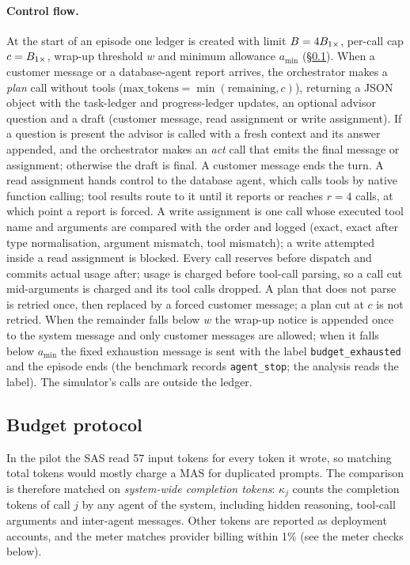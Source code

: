 \paragraph{Control flow.} At the start of an episode one ledger is created with limit $B = 4B_{1\times}$, per-call cap $c = B_{1\times}$, wrap-up threshold $w$ and minimum allowance $a_{\min}$ (\S\ref{sec:budget}). When a customer message or a database-agent report arrives, the orchestrator makes a \emph{plan} call without tools ($\text{max\_tokens} = \min(\text{remaining}, c)$), returning a JSON object with the task-ledger and progress-ledger updates, an optional advisor question and a draft (customer message, read assignment or write assignment). If a question is present the advisor is called with a fresh context and its answer appended, and the orchestrator makes an \emph{act} call that emits the final message or assignment; otherwise the draft is final. A customer message ends the turn. A read assignment hands control to the database agent, which calls tools by native function calling; tool results route to it until it reports or reaches $r = 4$ calls, at which point a report is forced. A write assignment is one call whose executed tool name and arguments are compared with the order and logged (exact, exact after type normalisation, argument mismatch, tool mismatch); a write attempted inside a read assignment is blocked. Every call reserves before dispatch and commits actual usage after; usage is charged before tool-call parsing, so a call cut mid-arguments is charged and its tool calls dropped. A plan that does not parse is retried once, then replaced by a forced customer message; a plan cut at $c$ is not retried. When the remainder falls below $w$ the wrap-up notice is appended once to the system message and only customer messages are allowed; when it falls below $a_{\min}$ the fixed exhaustion message is sent with the label \texttt{budget\_exhausted} and the episode ends (the benchmark records \texttt{agent\_stop}; the analysis reads the label). The simulator's calls are outside the ledger.

\subsection{Budget protocol}
\label{sec:budget}

In the pilot the SAS read 57 input tokens for every token it wrote, so matching total tokens would mostly charge a MAS for duplicated prompts. The comparison is therefore matched on \emph{system-wide completion tokens}: $\kappa_j$ counts the completion tokens of call $j$ by any agent of the system, including hidden reasoning, tool-call arguments and inter-agent messages. Other tokens are reported as deployment accounts, and the meter matches provider billing within 1\% (see the meter checks below).

